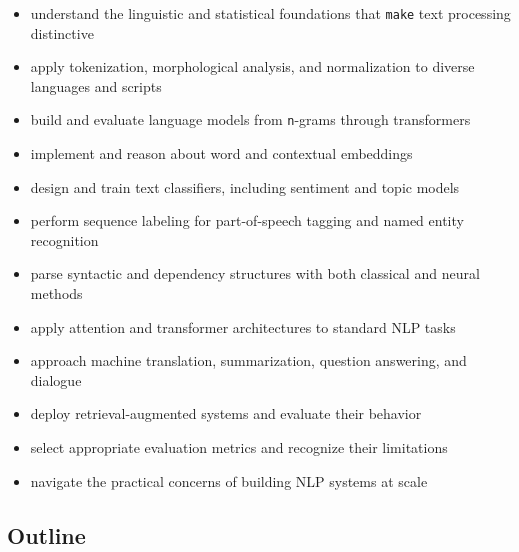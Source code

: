 \documentclass[
]{article}
\providecommand{\tightlist}{%
  \setlength{\itemsep}{0pt}\setlength{\parskip}{0pt}}
\begin{document}
\begin{itemize}
\tightlist
\item
  understand the linguistic and statistical foundations that
  \texttt{make} text processing distinctive
\item
  apply tokenization, morphological analysis, and normalization to
  diverse languages and scripts
\item
  build and evaluate language models from \texttt{n}-grams through
  transformers
\item
  implement and reason about word and contextual embeddings
\item
  design and train text classifiers, including sentiment and topic
  models
\item
  perform sequence labeling for part-of-speech tagging and named entity
  recognition
\item
  parse syntactic and dependency structures with both classical and
  neural methods
\item
  apply attention and transformer architectures to standard NLP tasks
\item
  approach machine translation, summarization, question answering, and
  dialogue
\item
  deploy retrieval-augmented systems and evaluate their behavior
\item
  select appropriate evaluation metrics and recognize their limitations
\item
  navigate the practical concerns of building NLP systems at scale
\end{itemize}

\subsection{Outline}\label{outline}
\end{document}
